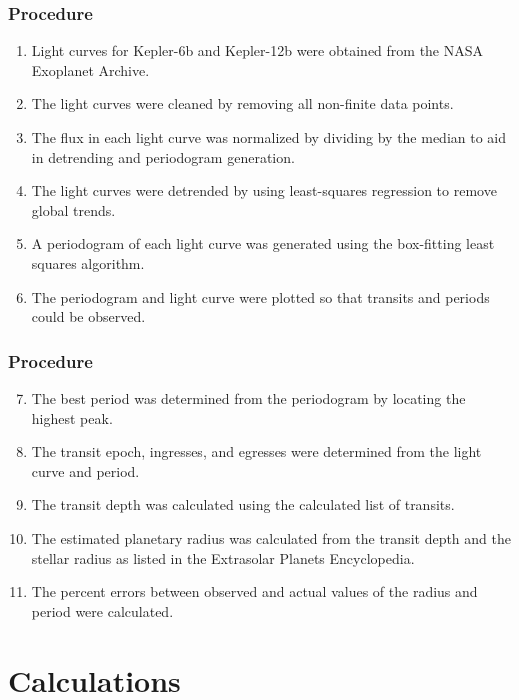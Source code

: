 \documentclass[xetex,mathserif,serif]{beamer}
\begin{document}
\begin{frame}
    \frametitle{Procedure}
    \begin{enumerate}
        \item<1-> Light curves for Kepler-6b and Kepler-12b were obtained from the NASA Exoplanet Archive.
        \item<2-> The light curves were cleaned by removing all non-finite data points.
        \item<3-> The flux in each light curve was normalized by dividing by the median to aid in detrending and periodogram generation.
        \item<4-> The light curves were detrended by using least-squares regression to remove global trends.
        \item<5-> A periodogram of each light curve was generated using the box-fitting least squares algorithm.
        \item<6-> The periodogram and light curve were plotted so that transits and periods could be observed.
    \end{enumerate}
\end{frame}

\begin{frame}
    \frametitle{Procedure}
    \begin{enumerate}
        \setcounter{enumi}{6}
        \item<1-> The best period was determined from the periodogram by locating the highest peak.
        \item<2-> The transit epoch, ingresses, and egresses were determined from the light curve and period.
        \item<3-> The transit depth was calculated using the calculated list of transits.
        \item<4-> The estimated planetary radius was calculated from the transit depth and the stellar radius as listed in the Extrasolar Planets Encyclopedia.
        \item<5-> The percent errors between observed and actual values of the radius and period were calculated.
    \end{enumerate}
\end{frame}

\section{Calculations}
\end{document}
